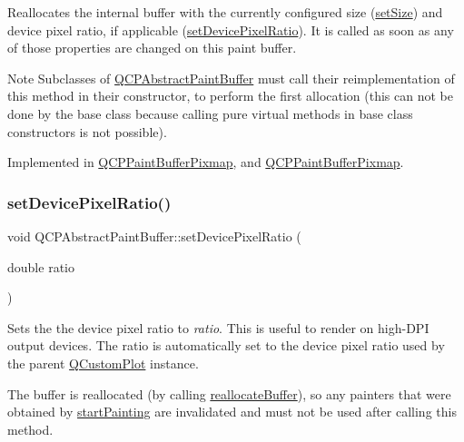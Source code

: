 Reallocates the internal buffer with the currently configured size (\hyperlink{class_q_c_p_abstract_paint_buffer_a8b68c3cd36533f1a4a23b5ce8cd66f01}{set\+Size}) and device pixel ratio, if applicable (\hyperlink{class_q_c_p_abstract_paint_buffer_a555eaad5d5c806420ff35602a1bb68fa}{set\+Device\+Pixel\+Ratio}). It is called as soon as any of those properties are changed on this paint buffer.

\begin{DoxyNote}{Note}
Subclasses of \hyperlink{class_q_c_p_abstract_paint_buffer}{Q\+C\+P\+Abstract\+Paint\+Buffer} must call their reimplementation of this method in their constructor, to perform the first allocation (this can not be done by the base class because calling pure virtual methods in base class constructors is not possible). 
\end{DoxyNote}


Implemented in \hyperlink{class_q_c_p_paint_buffer_pixmap_ad49f3205ba3463b1c44f8db3cfcc90f0}{Q\+C\+P\+Paint\+Buffer\+Pixmap}, and \hyperlink{class_q_c_p_paint_buffer_pixmap_a055692ff7293153ed5c589f3d7a6718e}{Q\+C\+P\+Paint\+Buffer\+Pixmap}.

\mbox{\label{class_q_c_p_abstract_paint_buffer_a555eaad5d5c806420ff35602a1bb68fa}} 
\subsubsection{\texorpdfstring{set\+Device\+Pixel\+Ratio()}{setDevicePixelRatio()}}
{\footnotesize\ttfamily void Q\+C\+P\+Abstract\+Paint\+Buffer\+::set\+Device\+Pixel\+Ratio (\begin{DoxyParamCaption}\item[{double}]{ratio }\end{DoxyParamCaption})}

Sets the the device pixel ratio to {\itshape ratio}. This is useful to render on high-\/\+D\+PI output devices. The ratio is automatically set to the device pixel ratio used by the parent \hyperlink{class_q_custom_plot}{Q\+Custom\+Plot} instance.

The buffer is reallocated (by calling \hyperlink{class_q_c_p_abstract_paint_buffer_aee7506a52bd7e5a07c2af27935eb13e7}{reallocate\+Buffer}), so any painters that were obtained by \hyperlink{class_q_c_p_abstract_paint_buffer_a9e9f29b19c033cf02fb96f1a148463f3}{start\+Painting} are invalidated and must not be used after calling this method.

